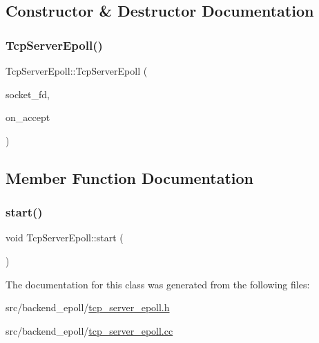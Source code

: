\subsection{Constructor \& Destructor Documentation}
\mbox{\label{classTcpServerEpoll_aaf7ecde753d57703ac9fbf21e489ea22}} 
\subsubsection{\texorpdfstring{Tcp\+Server\+Epoll()}{TcpServerEpoll()}}
{\footnotesize\ttfamily Tcp\+Server\+Epoll\+::\+Tcp\+Server\+Epoll (\begin{DoxyParamCaption}\item[{int}]{socket\+\_\+fd,  }\item[{const On\+Accept \&}]{on\+\_\+accept }\end{DoxyParamCaption})}



\subsection{Member Function Documentation}
\mbox{\label{classTcpServerEpoll_a03ad291fa33bf9749e9b940337c56064}} 
\subsubsection{\texorpdfstring{start()}{start()}}
{\footnotesize\ttfamily void Tcp\+Server\+Epoll\+::start (\begin{DoxyParamCaption}{ }\end{DoxyParamCaption})\hspace{0.3cm}{\ttfamily [override]}}



The documentation for this class was generated from the following files\+:\begin{DoxyCompactItemize}
\item 
src/backend\+\_\+epoll/\hyperlink{tcp__server__epoll_8h}{tcp\+\_\+server\+\_\+epoll.\+h}\item 
src/backend\+\_\+epoll/\hyperlink{tcp__server__epoll_8cc}{tcp\+\_\+server\+\_\+epoll.\+cc}\end{DoxyCompactItemize}
